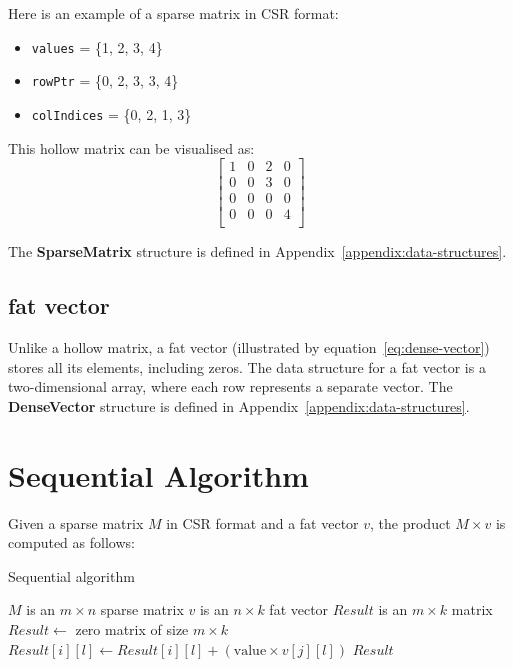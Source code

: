 \documentclass[12pt,oneside]{book} %
\begin{document}
Here is an example of a sparse matrix in CSR format:
\begin{itemize}
    \item \texttt{values} = \{1, 2, 3, 4\}
    \item \texttt{rowPtr} = \{0, 2, 3, 3, 4\}
    \item \texttt{colIndices} = \{0, 2, 1, 3\}
\end{itemize}

This hollow matrix can be visualised as:
\[
    \begin{bmatrix}
        1 & 0 & 2 & 0 \\
        0 & 0 & 3 & 0 \\
        0 & 0 & 0 & 0 \\
        0 & 0 & 0 & 4 \\
    \end{bmatrix}
\]

The \textbf{SparseMatrix} structure is defined in
Appendix~\ref{appendix:data-structures}.

\subsection{fat vector}
Unlike a hollow matrix, a fat vector (illustrated by
equation~\ref{eq:dense-vector}) stores all its elements, including zeros. The
data structure for a fat vector is a two-dimensional array, where each row
represents a separate vector. The \textbf{DenseVector} structure is defined in
Appendix~\ref{appendix:data-structures}.

\section{Sequential Algorithm}
Given a sparse matrix \( M \) in CSR format and a fat vector \( v \), the
product \( M \times v \) is computed as follows:

\begin{algorithm}[H]
    \caption{Sequential algorithm}
    \begin{algorithmic}
        \Require $M$ is an $m \times n$ sparse matrix
        \Require $v$ is an $n \times k$ fat vector
        \Ensure  $Result$ is an $m \times k$ matrix
        \State $Result \gets$ zero matrix of size $m \times k$
        \State $Result[i][l] \gets Result[i][l] + (\text{value} \times v[j][l])$
        \EndFor
        \EndFor
        \EndFor
        \State \Return $Result$
    \end{algorithmic}
\end{algorithm}
\end{document}
